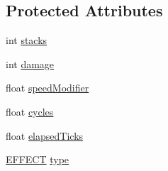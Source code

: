 \subsection*{Protected Attributes}
\begin{DoxyCompactItemize}
\item 
int \hyperlink{class_critter_effect_ad6b5573ff377524e3e434441a0cf8496}{stacks}
\item 
int \hyperlink{class_critter_effect_a972e96abb9c75f8af45a0a878cf2f0b9}{damage}
\item 
float \hyperlink{class_critter_effect_a70f3b198f8dacc9ca942c99b3d6ddb39}{speed\+Modifier}
\item 
float \hyperlink{class_critter_effect_aae5fb4e6fbff8c135128966ab8e9e0de}{cycles}
\item 
float \hyperlink{class_critter_effect_a5839d4edca217fa559f6a45ddc91a73b}{elapsed\+Ticks}
\item 
\hyperlink{class_critter_effect_a82b9b0530aff3cbf89c8cc6c60222419}{E\+F\+F\+E\+C\+T} \hyperlink{class_critter_effect_a25a88f402fc725134ed7d6e3376ed1d1}{type}
\end{DoxyCompactItemize}


